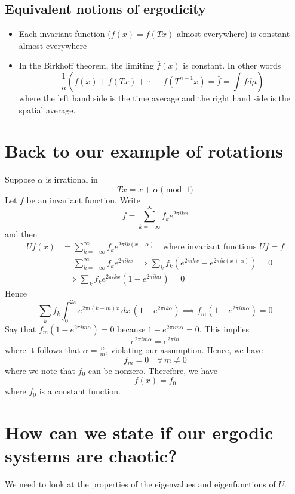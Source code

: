 \documentclass{article}
\begin{document}
\subsection{Equivalent notions of ergodicity}
\begin{itemize}
    \item Each invariant function ($f(x)=f(Tx)$ almost everywhere) is constant almost everywhere
    \item In the Birkhoff theorem, the limiting $\bar{f}(x)$ is constant. In other words \[ \frac{1}{n}\left(f(x) + f(Tx) +\cdots + f(T^{n-1}x)=\bar{f}=\int fd\mu\right) \] where the left hand side is the time average and the right hand side is the spatial average.
\end{itemize}

\section{Back to our example of rotations}

Suppose $\alpha$ is irrational in 
\[
Tx = x+\alpha \pmod 1
\]
Let $f$ be an invariant function. Write 
\[
f=\sum_{k=-\infty}^{\infty} f_k e^{2\pi i k x}
\]
and then 
\begin{align*}
    Uf(x) &= \sum_{k=-\infty}^{\infty}f_k e^{2\pi i k (x+\alpha)}\quad \text{where invariant functions $Uf=f$}\\
    &= \sum_{k=-\infty}^{\infty}f_k e^{2\pi i k x}\implies \sum_k f_k \left(e^{2\pi i k x}-e^{2\pi i k (x+\alpha)}\right)=0\\
    &\implies \sum_k f_k e^{2\pi i k x}\left( 1-e^{2\pi i k \alpha} \right)=0
\end{align*}
Hence 
\[
\sum_k f_k \int_{0}^{2\pi}e^{2\pi i (k-m)x}\, dx\, \left(1-e^{2\pi i k \alpha}\right)\implies f_m \left(1-e^{2\pi i m \alpha}\right) = 0
\]
Say that $f_m \left(1-e^{2\pi i m \alpha}\right) = 0$ because $1-e^{2\pi i m \alpha}=0$. This implies
\[
e^{2\pi i m \alpha} = e^{2\pi i n}
\]
where it follows that $\alpha=\frac{n}{m}$, violating our assumption. Hence, we have
\[
f_m=0 \quad \forall\, m\neq 0 
\]
where we note that $f_0$ can be nonzero. Therefore, we have 
\[
f(x)=f_0
\]
where $f_0$ is a constant function.

\section{How can we state if our ergodic systems are chaotic?}

We need to look at the properties of the eigenvalues and eigenfunctions of $U$.
\end{document}
